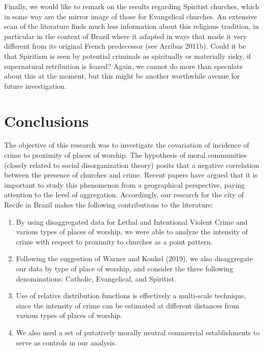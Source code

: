 \documentclass[smallextended]{svjour3}       %
\begin{document}
Finally, we would like to remark on the results regarding Spiritist
churches, which in some way are the mirror image of those for
Evangelical churches. An extensive scan of the literature finds much
less information about this religious tradition, in particular in the
context of Brazil where it adapted in ways that made it very different
from its original French predecessor (see Arribas 2011b). Could it be
that Spiritism is seen by potential criminals as spiritually or
materially risky, if supernatural retribution is feared? Again, we
cannot do more than speculate about this at the moment, but this might
be another worthwhile avenue for future investigation.

\hypertarget{conclusions}{%
\section{Conclusions}\label{conclusions}}

The objective of this research was to investigate the covariation of
incidence of crime to proximity of places of worship. The hypothesis of
moral communities (closely related to social disorganization theory)
posits that a negative correlation between the presence of churches and
crime. Recent papers have argued that it is important to study this
phenomenon from a geographical perspective, paying attention to the
level of aggregation. Accordingly, our research for the city of Recife
in Brazil makes the following contributions to the literature:

\begin{enumerate}
\def\labelenumi{\arabic{enumi}.}
\item
  By using disaggregated data for Lethal and Intentional Violent Crime
  and various types of places of worship, we were able to analyze the
  intensity of crime with respect to proximity to churches as a point
  pattern.
\item
  Following the suggestion of Warner and Konkel (2019), we also
  disaggregate our data by type of place of worship, and consider the
  three following denominations: Catholic, Evangelical, and Spiritist.
\item
  Use of relative distribution functions is effectively a multi-scale
  technique, since the intensity of crime can be estimated at different
  distances from various types of places of worship.
\item
  We also used a set of putatively morally neutral commercial
  establishments to serve as controls in our analysis.
\end{enumerate}
\end{document}
